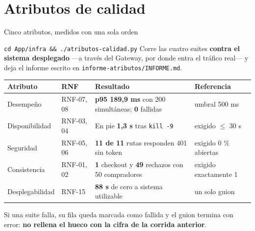 \documentclass[aspectratio=169,10pt,xcolor={table}]{beamer}
\newcommand{\cifra}[1]{{\color{hexaacento}\textbf{#1}}}
\begin{document}
\section{Atributos de calidad}

\begin{frame}{Cinco atributos, medidos con una sola orden}
  \begin{block}{\texttt{cd App/infra \&\& ./atributos-calidad.py}}
    \small Corre las cuatro suites \textbf{contra el sistema desplegado} ---a través del
    Gateway, por donde entra el tráfico real--- y deja el informe escrito en
    \texttt{informe-atributos/INFORME.md}.
  \end{block}

  \vspace{0.3em}
  \scriptsize
  \begin{tabular}{L{2.6cm}L{2.3cm}L{4.4cm}L{3.4cm}}
    \toprule
    \textbf{Atributo} & \textbf{RNF} & \textbf{Resultado} & \textbf{Referencia} \\
    \midrule
    Desempeño & RNF-07, 08 & \cifra{p95 189,9 ms} con 200 simultáneas; \cifra{0} fallidas &
      umbral 500 ms \\
    Disponibilidad & RNF-03, 04 & En pie \cifra{1,3 s} tras \texttt{kill -9} & exigido $\leq$ 30 s \\
    Seguridad & RNF-05, 06 & \cifra{11 de 11} rutas responden 401 sin token & exigido 0 \% abiertas \\
    Consistencia & RNF-01, 02 & \cifra{1} checkout y \cifra{49} rechazos con 50 compradores &
      exigido exactamente 1 \\
    Desplegabilidad & RNF-15 & \cifra{88 s} de cero a sistema utilizable & un solo guion \\
    \bottomrule
  \end{tabular}

  \vspace{0.4em}
  {\footnotesize Si una suite falla, su fila queda marcada como fallida y el guion termina con
  error: \textbf{no rellena el hueco con la cifra de la corrida anterior}.}
\end{frame}
\end{document}
